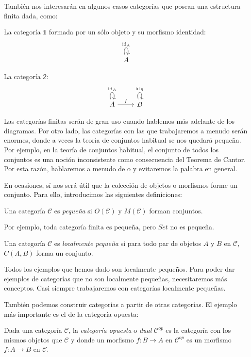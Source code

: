 \documentclass[12pt, twoside]{book}
\newcommand{\cat}{{\mathcal{C}}}
\newcommand{\Set}{{Set}}
\DeclareMathOperator{\id}{id}
\begin{document}
También nos interesarán en algunos casos categorías que posean una estructura finita dada, como:
\begin{example}
La categoría $\mathbb{1}$ formada por un sólo objeto y su morfismo identidad:
\[ \begin{tikzcd}
A \arrow[loop above,"\id_A"]
\end{tikzcd}\]
\end{example}

\begin{example}
La categoría $\mathbb{2}$:
\[ \begin{tikzcd}
A \arrow[loop above,"\id_A"] \arrow[r,"f"] & B \arrow[loop above,"\id_B"]
\end{tikzcd}\]
\end{example}

Las categorías finitas serán de gran uso cuando hablemos más adelante de los diagramas.
Por otro lado, las categorías con las que trabajaremos a menudo serán enormes, donde a veces la teoría de conjuntos habitual se nos quedará pequeña.
Por ejemplo, en la teoría de conjuntos habitual, el conjunto de todos los conjuntos es una noción inconsistente como consecuencia del Teorema de Cantor.
Por esta razón, hablaremos a menudo de  o  y evitaremos la palabra  en general.

En ocasiones, sí nos será útil que la colección de objetos o morfismos forme un conjunto.
Para ello, introducimos las siguientes definiciones:

\begin{definition}
Una categoría $\cat$ es \emph{pequeña} si $O(\cat)$ y $M(\cat)$ forman conjuntos.
\end{definition}

Por ejemplo, toda categoría finita es pequeña, pero $\Set$ no es pequeña.

\begin{definition}
Una categoría $\cat$ es \emph{localmente pequeña} si para todo par de objetos $A$ y $B$ en $\cat$, $C(A,B)$ forma un conjunto.
\end{definition}

Todos los ejemplos que hemos dado son localmente pequeños.
Para poder dar ejemplos de categorías que no son localmente pequeñas, necesitaremos más conceptos.
Casi siempre trabajaremos con categorías localmente pequeñas.

También podemos construir categorías a partir de otras categorías.
El ejemplo más importante es el de la categoría opuesta:
\begin{definition}
Dada una categoría $\cat$, la \emph{categoría opuesta} o \emph{dual} $\cat^{op}$ es la categoría con los mismos objetos que $\cat$ y donde un morfismo $f \colon B \to A$ en $\cat^{op}$ es un morfismo $f \colon A \to B$ en $\cat$.
\end{definition}
\end{document}
